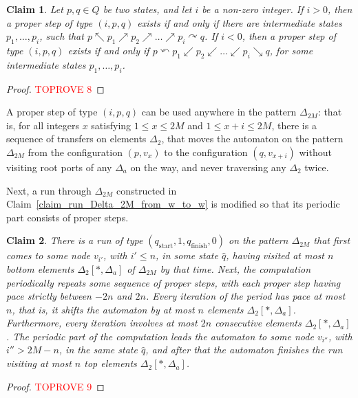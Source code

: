 \documentclass[12pt,a4paper]{article}
\newtheorem{claim}{Claim}
\theoremstyle{definition}
\begin{document}
\begin{claim}\label{claim_sequence_for_step_partition}
Let $p,q \in Q$ be two states, and let $i$ be a non-zero integer.
If $i > 0$, then a proper step of type $(i,p,q)$
exists if and only if
there are intermediate states $p_1,\ldots,p_i$,
such that $p \nwarrow p_1 \nearrow p_2 \nearrow \ldots \nearrow p_i \curvearrowright q$.
If $i < 0$, then a proper step of type $(i,p,q)$
exists if and only if
$p \curvearrowleft p_1 \swarrow p_2 \swarrow \ldots \swarrow p_i \searrow q$,
for some intermediate states $p_1,\ldots,p_i$.
\end{claim}
\begin{proof}\textcolor{red}{TOPROVE 8}\end{proof}

A proper step of type $(i,p,q)$ can be used anywhere in the pattern $\Delta_{2M}$:
that is, for all integers $x$ satisfying $1 \leqslant x \leqslant 2M$
and $1 \leqslant x+i \leqslant 2M$,
there is a sequence of transfers
on elements $\Delta_2$, that moves the automaton on the pattern $\Delta_{2M}$
from the configuration $(p, v_x)$ 
to the configuration $(q,v_{x+i})$
without visiting root ports of any $\Delta_a$ on the way,
and never traversing any $\Delta_2$ twice.

Next, a run through $\Delta_{2M}$ constructed in Claim~\ref{claim_run_Delta_2M_from_w_to_w}
is modified so that its periodic part consists of proper steps.

\begin{claim}\label{claim_run_Delta_2M_from_v_to_v}
There is a run of type $(q_{\text{start}},1,q_{\text{finish}},0)$
on the pattern $\Delta_{2M}$
that first comes to some node $v_{i'}$, with $i' \leqslant n$,
in some state $\widehat{q}$,
having visited at most $n$ bottom elements $\Delta_2[*,\Delta_a]$ of $\Delta_{2M}$ by that time.
Next, the computation periodically repeats some sequence of proper steps,
with each proper step having pace strictly between $-2n$ and $2n$.
Every iteration of the period has pace at most $n$,
that is, it shifts the automaton by at most $n$ elements $\Delta_2[*,\Delta_a]$.
Furthermore, every iteration involves at most $2n$ consecutive elements $\Delta_2[*,\Delta_a]$.
The periodic part of the computation
leads the automaton to some node $v_{i''}$, with $i'' > 2M-n$,
in the same state $\widehat{q}$,
and after that the automaton finishes the run
visiting at most $n$ top elements $\Delta_2[*,\Delta_a]$.
\end{claim}
\begin{proof}\textcolor{red}{TOPROVE 9}\end{proof}
\end{document}
